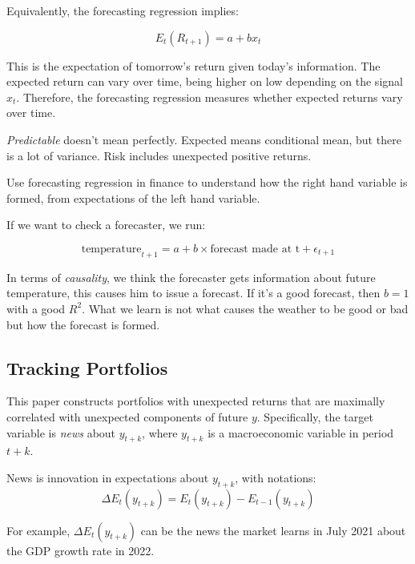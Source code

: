 Equivalently, the forecasting regression implies:

\begin{equation}
    E_t(R_{t+1}) = a + bx_t
\end{equation}

This is the expectation of tomorrow's return given today's
information. The expected return can vary over time, 
being higher on low depending on the signal $x_t$.
Therefore, the forecasting regression measures whether 
expected returns vary over time.

\textit{Predictable} doesn't mean perfectly. Expected means 
conditional mean, but there is a lot of variance. Risk 
includes unexpected positive returns.

Use forecasting regression in finance to understand 
how the right hand variable is formed, from expectations 
of the left hand variable. 

If we want to check a forecaster, we run:

\begin{equation}
    \text{temperature}_{t+1} = a + b \times \text{forecast made at t} + \epsilon_{t+1}
\end{equation}

In terms of \textit{causality}, we think the forecaster 
gets information about future temperature, this causes him to 
issue a forecast. If it's a good forecast, then $b=1$ with a good
$R^2$. What we learn is not what causes the weather to be good 
or bad but how the forecast is formed.



\subsection{Tracking Portfolios}

This paper constructs portfolios with unexpected returns 
that are maximally correlated with unexpected components 
of future $y$. Specifically, the target variable is \textit{news}
about $y_{t+k}$, where $y_{t+k}$ is a macroeconomic variable
in period $t+k$. 

News is innovation in expectations about $y_{t+k}$, with 
notations:
\begin{equation}
    \Delta E_t(y_{t+k}) = E_t(y_{t+k}) - E_{t-1}(y_{t+k})
\end{equation}

For example, $\Delta E_t(y_{t+k})$ can be the news the market 
learns in July 2021 about the GDP growth rate in 2022.


